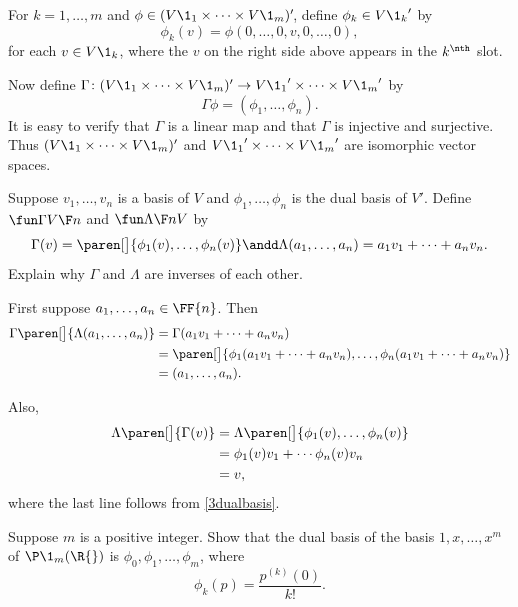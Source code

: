 \begin{Solution}
For $k = 1, \dots, m$ and $\phi \in (V\1_1 \times \dots \times V\1_m)'\!$, define $\phi_k \in {V\1_k}'$ by
\[
\phi_k(v) = \phi( 0, \dots, 0, v, 0, \dots, 0),
\]
for each $v \in V\1_k$, where the $v$ on the right side above appears in the $k^\nth$ slot.

Now define $\Gamma \colon (V\1_1 \times \dots \times V\1_m)' \to {V\1_1}' \times \dots \times {V\1_m}'$ by
\[
\Gamma \phi = (\phi_1, \dots, \phi_n).
\]
It is easy to verify that $\Gamma$ is a linear map and that $\Gamma$ is injective and surjective. Thus $(V\1_1 \times \dots \times V\1_m)'$ and ${V\1_1}' \times \dots \times {V\1_m}'$ are isomorphic vector spaces.
\end{Solution}

\exercise
Suppose $v_1, \ldots, v_n$ is a basis of $V$ and $\phi_1, \ldots, \phi_n$ is the dual basis of $V'\!$. Define $\fun \Gamma  V {\F n}$ and
$\fun \Lambda {\F n} V$ by
\[
\Gamma(v) = \paren[\big]{ \phi_1(v), \ldots, \phi_n(v) }
\andd
\Lambda(a_1, \ldots, a_n) = a_1 v_1 + \cdots + a_n v_n.
\]
Explain why $\Gamma$ and $\Lambda$ are inverses of each other.

\begin{Solution}
First suppose $a_1, \ldots, a_n \in \FF{n}$. Then
\begin{align*}
\Gamma\paren[\big]{ \Lambda(a_1, \ldots, a_n) } &= \Gamma( a_1 v_1 + \cdots + a_n v_n ) \\
&= \paren[\big]{ \phi_1( a_1 v_1 + \cdots + a_n v_n ), \ldots, \phi_n( a_1 v_1 + \cdots + a_n v_n ) }\\
&= (a_1, \ldots, a_n).
\end{align*}

Also,
\begin{align*}
\Lambda\paren[\big]{\Gamma(v) } &= \Lambda\paren[\big]{ \phi_1(v), \ldots, \phi_n(v) } \\
&=  \phi_1(v) v_1 + \cdots \phi_n(v) v_n \\
&= v,
\end{align*}
where the last line follows from \ref{3dualbasis}.
\end{Solution}

\exercise
Suppose $m$ is a positive integer. Show that the dual basis of the basis $1, x, \dots, x^m$ of $\P\1_m(\R{})$ is $\phi_0, \phi_1, \dots, \phi_m$, where
\[
\phi_k(p) = \frac{p^{(k)}(0)}{k!}.
\]

